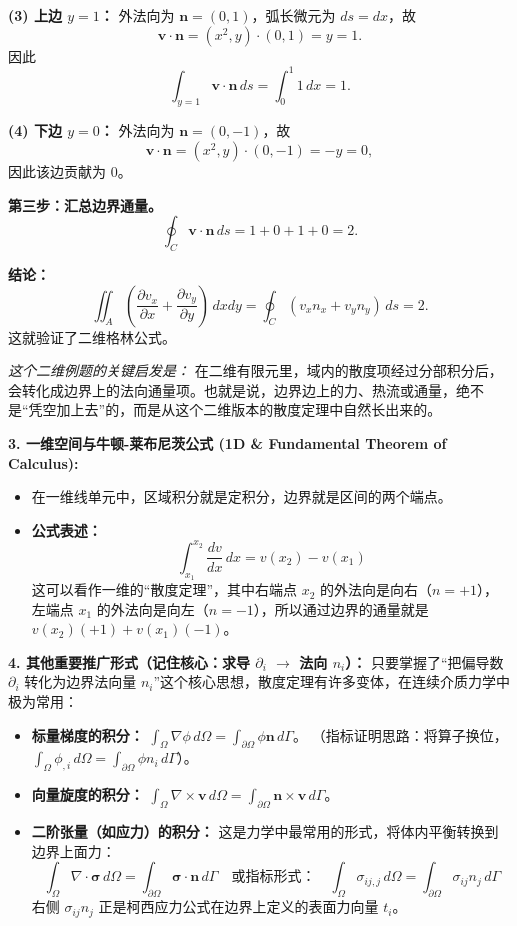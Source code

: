 \documentclass[11pt, a4paper, UTF8]{ctexart}
\begin{document}
\textbf{(3) 上边 $y=1$：}
外法向为 $\bm{n}=(0,1)$，弧长微元为 $ds=dx$，故
\[
\bm{v}\cdot\bm{n} = (x^2,y)\cdot(0,1)=y=1.
\]
因此
\[
\int_{y=1} \bm{v}\cdot\bm{n}\, ds
=
\int_0^1 1\, dx = 1.
\]

\textbf{(4) 下边 $y=0$：}
外法向为 $\bm{n}=(0,-1)$，故
\[
\bm{v}\cdot\bm{n} = (x^2,y)\cdot(0,-1)=-y=0,
\]
因此该边贡献为 0。

\textbf{第三步：汇总边界通量。}
\[
\oint_C \bm{v}\cdot\bm{n}\, ds
=
1+0+1+0 = 2.
\]

\textbf{结论：}
\[
\iint_A \left(\frac{\partial v_x}{\partial x}+\frac{\partial v_y}{\partial y}\right)\, dxdy
=
\oint_C (v_x n_x + v_y n_y)\, ds
=2.
\]
这就验证了二维格林公式。

\textit{这个二维例题的关键启发是：} 在二维有限元里，域内的散度项经过分部积分后，会转化成边界上的法向通量项。也就是说，边界边上的力、热流或通量，绝不是“凭空加上去”的，而是从这个二维版本的散度定理中自然长出来的。

\textbf{3. 一维空间与牛顿-莱布尼茨公式 (1D \& Fundamental Theorem of Calculus):}
\begin{itemize}
    \item 在一维线单元中，区域积分就是定积分，边界就是区间的两个端点。
    \item \textbf{公式表述：} 
    \[ \int_{x_1}^{x_2} \frac{dv}{dx} \, dx = v(x_2) - v(x_1) \]
    这可以看作一维的“散度定理”，其中右端点 $x_2$ 的外法向是向右（$n=+1$），左端点 $x_1$ 的外法向是向左（$n=-1$），所以通过边界的通量就是 $v(x_2)(+1) + v(x_1)(-1)$。
\end{itemize}

\textbf{4. 其他重要推广形式（记住核心：求导 $\partial_i$ $\rightarrow$ 法向 $n_i$）：}
只要掌握了“把偏导数 $\partial_i$ 转化为边界法向量 $n_i$”这个核心思想，散度定理有许多变体，在连续介质力学中极为常用：
\begin{itemize}
    \item \textbf{标量梯度的积分：} $\int_{\Omega} \nabla \phi \, d\Omega = \int_{\partial\Omega} \phi \bm{n} \, d\Gamma$。
    （指标证明思路：将算子换位，$\int_{\Omega} \phi_{,i} \, d\Omega = \int_{\partial\Omega} \phi n_i \, d\Gamma$）。
    \item \textbf{向量旋度的积分：} $\int_{\Omega} \nabla \times \bm{v} \, d\Omega = \int_{\partial\Omega} \bm{n} \times \bm{v} \, d\Gamma$。
    \item \textbf{二阶张量（如应力）的积分：} 这是力学中最常用的形式，将体内平衡转换到边界上面力：
    \[ \int_{\Omega} \nabla \cdot \bm{\sigma} \, d\Omega = \int_{\partial\Omega} \bm{\sigma} \cdot \bm{n} \, d\Gamma \quad \text{或指标形式：} \quad \int_{\Omega} \sigma_{ij,j} \, d\Omega = \int_{\partial\Omega} \sigma_{ij} n_j \, d\Gamma \]
    右侧 $\sigma_{ij} n_j$ 正是柯西应力公式在边界上定义的表面力向量 $t_i$。
\end{itemize}
\end{document}
